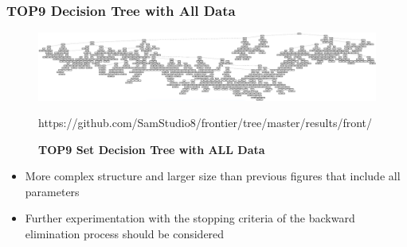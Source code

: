 \documentclass{beamer}
\begin{document}
\begin{frame}[t]
    \frametitle{TOP9 Decision Tree with All Data}
    \begin{figure}[htbp!]
        \centering
        \includegraphics[width=1\textwidth]{img/TOP9_ALL_1.png}
        \tiny{\caption[top9-all-1]{\textbf{TOP9 Set Decision Tree with ALL Data}}}

        \tiny{https://github.com/SamStudio8/frontier/tree/master/results/front/}
    \end{figure}
    \begin{itemize}
        \item More complex structure and larger size than previous figures that
            include all parameters
        \item Further experimentation with the stopping criteria of the backward
            elimination process should be considered
    \end{itemize}
\end{frame}
\end{document}
